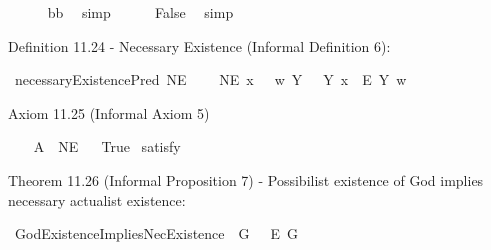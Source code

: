 \begin{isabellebody}
\ \ \ \ \isamarkupfalse%
\ {\isachardoublequoteopen}{\isasymnot}{\isacharparenleft}b{\isacharequal}b{\isacharparenright}{\isachardoublequoteclose}\ \isamarkupfalse%
\ simp\isanewline
\ \ \ \ \isamarkupfalse%
\ False\ \isamarkupfalse%
\ simp\isanewline
\ \ \isamarkupfalse%
\isanewline
{}\isamarkupfalse%
%
\endisatagproof
{\isafoldproof}%
%
\isadelimproof
%
\endisadelimproof
%
\begin{isamarkuptext}%
Definition 11.24 - Necessary Existence (Informal Definition 6):%
\end{isamarkuptext}\isamarkuptrue%
\isamarkupfalse%
\ necessaryExistencePred{\isacharcolon}{\isacharcolon}{\isachardoublequoteopen}{\isasymup}{\isasymlangle}{\isasymzero}{\isasymrangle}{\isachardoublequoteclose}\ {\isacharparenleft}{\isachardoublequoteopen}NE{\isachardoublequoteclose}{\isacharparenright}\ \isanewline
\ \ \ {\isachardoublequoteopen}NE\ x\ \ {\isasymequiv}\ {\isacharparenleft}{\isasymlambda}w{\isachardot}\ {\isacharparenleft}\isactrlbold {\isasymforall}Y{\isachardot}\ \ {\isasymE}\ Y\ x\ \isactrlbold {\isasymrightarrow}\ \isactrlbold {\isasymbox}\isactrlbold {\isasymexists}\isactrlsup E\ Y{\isacharparenright}\ w{\isacharparenright}{\isachardoublequoteclose}%
\begin{isamarkuptext}%
Axiom 11.25 (Informal Axiom 5)%
\end{isamarkuptext}\isamarkuptrue%
\isamarkupfalse%
\ \ \isanewline
\ A{}{\isacharcolon}\ {\isachardoublequoteopen}{\isasymlfloor}{\isasymP}\ NE{\isasymrfloor}{\isachardoublequoteclose}\isanewline
\ \isanewline
{}\isamarkupfalse%
\ True\ \isamarkupfalse%
{\isacharbrackleft}satisfy{\isacharbrackright}%
\isadelimproof
\ %
\endisadelimproof
%
\isatagproof
{}\isamarkupfalse%
\ %
%
\endisatagproof
{\isafoldproof}%
%
\isadelimproof
%
\endisadelimproof
%
\begin{isamarkuptext}%
Theorem 11.26 (Informal Proposition 7) - Possibilist existence of God implies necessary actualist existence:%
\end{isamarkuptext}\isamarkuptrue%
\isamarkupfalse%
\ GodExistenceImpliesNecExistence{\isacharcolon}\ {\isachardoublequoteopen}{\isasymlfloor}\isactrlbold {\isasymexists}\ G\ \isactrlbold {\isasymrightarrow}\ \ \isactrlbold {\isasymbox}\isactrlbold {\isasymexists}\isactrlsup E\ G{\isasymrfloor}{\isachardoublequoteclose}\isanewline

\end{isabellebody}
